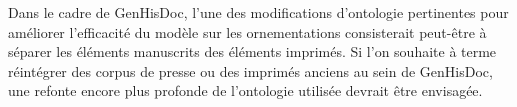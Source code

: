 Dans le cadre de GenHisDoc, l'une des modifications d'ontologie pertinentes pour améliorer l'efficacité du modèle sur les ornementations consisterait peut-être à séparer les éléments manuscrits des éléments imprimés. Si l'on souhaite à terme réintégrer des corpus de presse ou des imprimés anciens au sein de GenHisDoc, une refonte encore plus profonde de l'ontologie utilisée devrait être envisagée.